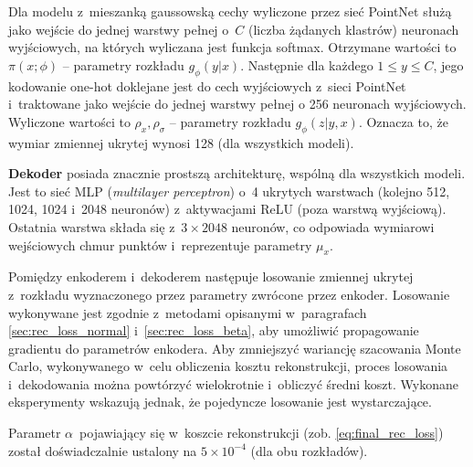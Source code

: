 \documentclass{iithesis}
\begin{document}
Dla modelu z~mieszanką gaussowską cechy wyliczone przez sieć PointNet służą
jako wejście do jednej warstwy pełnej o~$C$ (liczba żądanych klastrów)
neuronach wyjściowych, na których wyliczana jest funkcja softmax. Otrzymane wartości to $\pi(x;\phi)$ --
parametry rozkładu $g_\phi(y|x)$. Następnie dla każdego $1 \leq y \leq C$, jego kodowanie one-hot doklejane
jest do cech wyjściowych z~sieci PointNet i~traktowane jako wejście do jednej warstwy pełnej o
256 neuronach wyjściowych. Wyliczone wartości to $\rho_x,\rho_\sigma$ -- parametry rozkładu $g_\phi(z|y,x)$.
Oznacza to, że wymiar zmiennej ukrytej wynosi 128 (dla wszystkich modeli).

\textbf{Dekoder} posiada znacznie prostszą architekturę, wspólną dla wszystkich modeli.
Jest to sieć MLP (\textit{multilayer perceptron}) o~4 ukrytych warstwach
(kolejno 512, 1024, 1024 i~2048 neuronów) z~aktywacjami ReLU (poza warstwą wyjściową).
Ostatnia warstwa składa się z~$3 \times 2048$ neuronów, co odpowiada wymiarowi wejściowych chmur punktów
i~reprezentuje parametry $\mu_x$.

Pomiędzy enkoderem i~dekoderem następuje losowanie zmiennej ukrytej z~rozkładu wyznaczonego
przez parametry zwrócone przez enkoder. Losowanie wykonywane jest zgodnie z~metodami opisanymi w~paragrafach
\ref{sec:rec_loss_normal} i~\ref{sec:rec_loss_beta}, aby umożliwić propagowanie gradientu
do parametrów enkodera. Aby zmniejszyć wariancję szacowania Monte Carlo, wykonywanego
w~celu obliczenia kosztu rekonstrukcji, proces losowania i~dekodowania można powtórzyć wielokrotnie
i~obliczyć średni koszt. Wykonane eksperymenty wskazują jednak, że pojedyncze losowanie jest wystarczające.

Parametr $\alpha$~pojawiający się w~koszcie rekonstrukcji (zob. \ref{eq:final_rec_loss}) został doświadczalnie
ustalony na $5 \times 10^{-4}$ (dla obu rozkładów).
\end{document}

